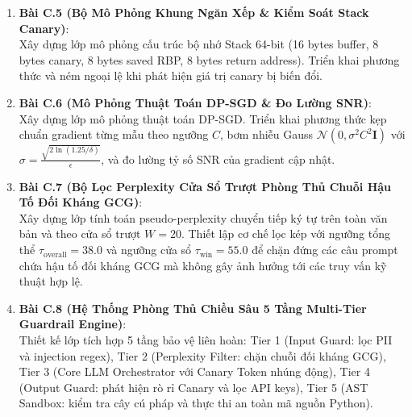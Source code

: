 \begin{enumerate}
  \item \textbf{Bài C.5 (Bộ Mô Phỏng Khung Ngăn Xếp \& Kiểm Soát Stack Canary)}: \\
  Xây dựng lớp  mô phỏng cấu trúc bộ nhớ Stack 64-bit (16 bytes buffer, 8 bytes canary, 8 bytes saved RBP, 8 bytes return address). Triển khai phương thức  và  ném ngoại lệ  khi phát hiện giá trị canary bị biến đổi.

  \item \textbf{Bài C.6 (Mô Phỏng Thuật Toán DP-SGD \& Đo Lường SNR)}: \\
  Xây dựng lớp  mô phỏng thuật toán DP-SGD. Triển khai phương thức kẹp chuẩn gradient từng mẫu theo ngưỡng $C$, bơm nhiễu Gauss $\mathcal{N}(0, \sigma^2 C^2 \mathbf{I})$ với $\sigma = \frac{\sqrt{2\ln(1.25/\delta)}}{\epsilon}$, và đo lường tỷ số SNR của gradient cập nhật.

  \item \textbf{Bài C.7 (Bộ Lọc Perplexity Cửa Sổ Trượt Phòng Thủ Chuỗi Hậu Tố Đối Kháng GCG)}: \\
  Xây dựng lớp  tính toán pseudo-perplexity chuyển tiếp ký tự trên toàn văn bản và theo cửa sổ trượt $W = 20$. Thiết lập cơ chế lọc kép với ngưỡng tổng thể $\tau_{\text{overall}} = 38.0$ và ngưỡng cửa sổ $\tau_{\text{win}} = 55.0$ để chặn đứng các câu prompt chứa hậu tố đối kháng GCG mà không gây ảnh hưởng tới các truy vấn kỹ thuật hợp lệ.

  \item \textbf{Bài C.8 (Hệ Thống Phòng Thủ Chiều Sâu 5 Tầng Multi-Tier Guardrail Engine)}: \\
  Thiết kế lớp  tích hợp 5 tầng bảo vệ liên hoàn:
  Tier 1 (Input Guard: lọc PII và injection regex),
  Tier 2 (Perplexity Filter: chặn chuỗi đối kháng GCG),
  Tier 3 (Core LLM Orchestrator với Canary Token nhúng động),
  Tier 4 (Output Guard: phát hiện rò rỉ Canary và lọc API keys),
  Tier 5 (AST Sandbox: kiểm tra cây cú pháp và thực thi an toàn mã nguồn Python).
\end{enumerate}

